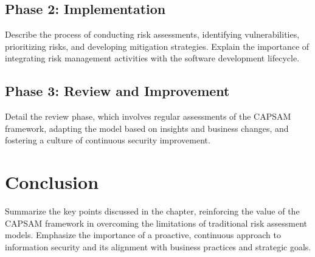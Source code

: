     \subsection{Phase 2: Implementation}
    Describe the process of conducting risk assessments, identifying vulnerabilities, prioritizing risks, and developing mitigation strategies. Explain the importance of integrating risk management activities with the software development lifecycle.

    \subsection{Phase 3: Review and Improvement}
    Detail the review phase, which involves regular assessments of the CAPSAM framework, adapting the model based on insights and business changes, and fostering a culture of continuous security improvement.

\section{Conclusion}
Summarize the key points discussed in the chapter, reinforcing the value of the CAPSAM framework in overcoming the limitations of traditional risk assessment models. Emphasize the importance of a proactive, continuous approach to information security and its alignment with business practices and strategic goals.